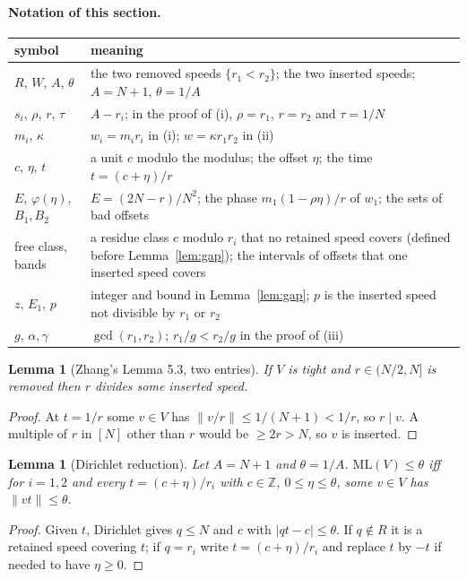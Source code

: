 \documentclass[11pt]{article}
\newtheorem{lemma}[theorem]{Lemma}
\theoremstyle{definition}
\theoremstyle{remark}
\newcommand{\nd}[1]{\lVert #1\rVert}
\newcommand{\ML}{\mathrm{ML}}
\newcommand{\ZZ}{\mathbb{Z}}
\begin{document}
\paragraph{Notation of this section.}
\begin{center}
\small
\begin{tabular}{l p{}}
\toprule
symbol & meaning \\
\midrule
$R$, $W$, $A$, $\theta$ & the two removed speeds $\{r_1<r_2\}$; the two inserted speeds; $A=N+1$, $\theta=1/A$ \\
$s_i$, $\rho$, $r$, $\tau$ & $A-r_i$; in the proof of (i), $\rho=r_1$, $r=r_2$ and $\tau=1/N$ \\
$m_i$, $\kappa$ & $w_i=m_ir_i$ in (i); $w=\kappa r_1r_2$ in (ii) \\
$c$, $\eta$, $t$ & a unit $c$ modulo the modulus; the offset $\eta$; the time $t=(c+\eta)/r$ \\
$E$, $\varphi(\eta)$, $B_1,B_2$ & $E=(2N-r)/N^2$; the phase $m_1(1-\rho\eta)/r$ of $w_1$; the sets of bad offsets \\
free class, bands & a residue class $c$ modulo $r_i$ that no retained speed covers (defined before Lemma~\ref{lem:gap}); the intervals of offsets that one inserted speed covers \\
$z$, $E_1$, $p$ & integer and bound in Lemma~\ref{lem:gap}; $p$ is the inserted speed not divisible by $r_1$ or $r_2$ \\
$g$, $\alpha,\gamma$ & $\gcd(r_1,r_2)$; $r_1/g<r_2/g$ in the proof of (iii) \\
\bottomrule
\end{tabular}
\end{center}

\begin{lemma}[Zhang's Lemma 5.3, two entries]\label{lem:five}
If $V$ is tight and $r\in(N/2,N]$ is removed then $r$ divides some inserted speed.
\end{lemma}
\begin{proof}
At $t=1/r$ some $v\in V$ has $\nd{v/r}\le1/(N+1)<1/r$, so $r\mid v$. A multiple of $r$ in $[N]$ other than $r$ would be $\ge2r>N$, so $v$ is inserted.
\end{proof}

\begin{lemma}[Dirichlet reduction]\label{lem:dir}
Let $A=N+1$ and $\theta=1/A$. $\ML(V)\le\theta$ iff for $i=1,2$ and every $t=(c+\eta)/r_i$ with $c\in\ZZ$, $0\le\eta\le\theta$, some $v\in V$ has $\nd{vt}\le\theta$.
\end{lemma}
\begin{proof}
Given $t$, Dirichlet gives $q\le N$ and $c$ with $|qt-c|\le\theta$. If $q\notin R$ it is a retained speed covering $t$; if $q=r_i$ write $t=(c+\eta)/r_i$ and replace $t$ by $-t$ if needed to have $\eta\ge0$.
\end{proof}
\end{document}
